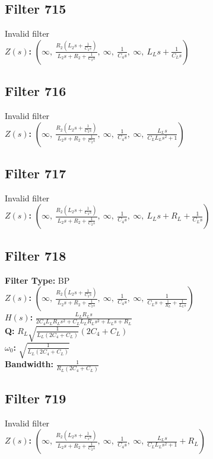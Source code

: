 \documentclass{article}
\begin{document}
\subsection*{Filter 715}
Invalid filter \\ 
\textbf{$Z(s)$:} $\left( \infty, \  \frac{R_{2} \left(L_{2} s + \frac{1}{C_{2} s}\right)}{L_{2} s + R_{2} + \frac{1}{C_{2} s}}, \  \infty, \  \frac{1}{C_{4} s}, \  \infty, \  L_{L} s + \frac{1}{C_{L} s}\right)$ \\ 
\subsection*{Filter 716}
Invalid filter \\ 
\textbf{$Z(s)$:} $\left( \infty, \  \frac{R_{2} \left(L_{2} s + \frac{1}{C_{2} s}\right)}{L_{2} s + R_{2} + \frac{1}{C_{2} s}}, \  \infty, \  \frac{1}{C_{4} s}, \  \infty, \  \frac{L_{L} s}{C_{L} L_{L} s^{2} + 1}\right)$ \\ 
\subsection*{Filter 717}
Invalid filter \\ 
\textbf{$Z(s)$:} $\left( \infty, \  \frac{R_{2} \left(L_{2} s + \frac{1}{C_{2} s}\right)}{L_{2} s + R_{2} + \frac{1}{C_{2} s}}, \  \infty, \  \frac{1}{C_{4} s}, \  \infty, \  L_{L} s + R_{L} + \frac{1}{C_{L} s}\right)$ \\ 
\subsection*{Filter 718}
\textbf{Filter Type:} BP \\ 
\textbf{$Z(s)$:} $\left( \infty, \  \frac{R_{2} \left(L_{2} s + \frac{1}{C_{2} s}\right)}{L_{2} s + R_{2} + \frac{1}{C_{2} s}}, \  \infty, \  \frac{1}{C_{4} s}, \  \infty, \  \frac{1}{C_{L} s + \frac{1}{R_{L}} + \frac{1}{L_{L} s}}\right)$ \\ 
\textbf{$H(s)$:} $\frac{L_{L} R_{L} s}{2 C_{4} L_{L} R_{L} s^{2} + C_{L} L_{L} R_{L} s^{2} + L_{L} s + R_{L}}$ \\ 
\textbf{Q:} $R_{L} \sqrt{\frac{1}{L_{L} \left(2 C_{4} + C_{L}\right)}} \left(2 C_{4} + C_{L}\right)$ \\ 
\textbf{$\omega_0$:} $\sqrt{\frac{1}{L_{L} \left(2 C_{4} + C_{L}\right)}}$ \\ 
\textbf{Bandwidth:} $\frac{1}{R_{L} \left(2 C_{4} + C_{L}\right)}$ \\ 
\subsection*{Filter 719}
Invalid filter \\ 
\textbf{$Z(s)$:} $\left( \infty, \  \frac{R_{2} \left(L_{2} s + \frac{1}{C_{2} s}\right)}{L_{2} s + R_{2} + \frac{1}{C_{2} s}}, \  \infty, \  \frac{1}{C_{4} s}, \  \infty, \  \frac{L_{L} s}{C_{L} L_{L} s^{2} + 1} + R_{L}\right)$ \\ 
\end{document}

